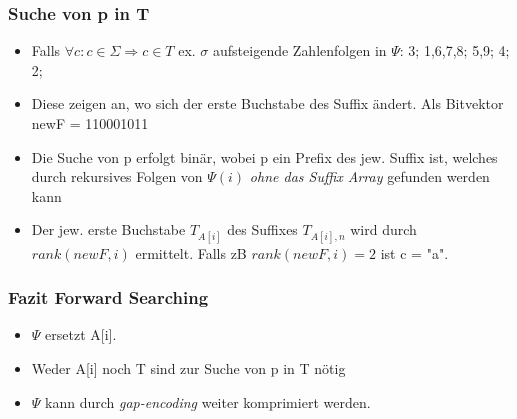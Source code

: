 \documentclass{beamer}
\begin{document}
\begin{frame}
\frametitle{Suche von p in T}
\begin{itemize}
\item Falls $\forall c: c \in \Sigma \Rightarrow c \in T$ ex. $\sigma$ aufsteigende Zahlenfolgen in $\Psi$: 3; 1,6,7,8; 5,9; 4; 2;
\item Diese zeigen an, wo sich der erste Buchstabe des Suffix \"andert. Als Bitvektor newF = 110001011
\item Die Suche von p erfolgt bin\"ar, wobei p ein Prefix des jew. Suffix ist, welches durch rekursives Folgen von $\Psi(i)$ \textit{ohne das Suffix Array} gefunden werden kann
\item Der jew. erste Buchstabe $T_{A[i]}$ des Suffixes $T_{A[i],n}$ wird durch $rank(newF,i)$ ermittelt. Falls zB $rank(newF,i) = 2$ ist c = "a".
\end{itemize}
\end{frame}
\begin{frame}
\frametitle{Fazit Forward Searching}
\begin{itemize}
\item $\Psi$ ersetzt A[i].
\item Weder A[i] noch T sind zur Suche von p in T n\"otig
\item $\Psi$ kann durch \textit{gap-encoding} weiter komprimiert werden.
\end{itemize}
\end{frame}
\end{document}
